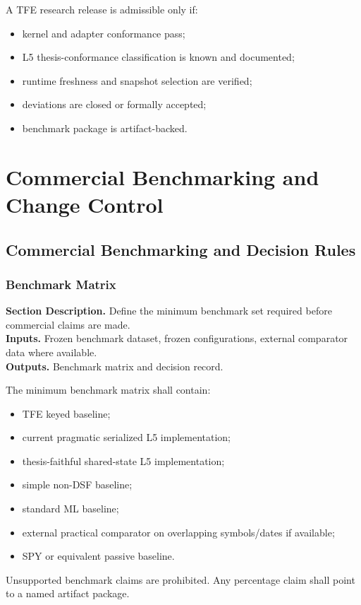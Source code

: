 \documentclass[11pt]{report}
\newcommand{\meta}[3]{\textbf{Section Description.} #1\\
\textbf{Inputs.} #2\\
\textbf{Outputs.} #3\par}
\begin{document}
A TFE research release is admissible only if:
\begin{itemize}
    \item kernel and adapter conformance pass;
    \item L5 thesis-conformance classification is known and documented;
    \item runtime freshness and snapshot selection are verified;
    \item deviations are closed or formally accepted;
    \item benchmark package is artifact-backed.
\end{itemize}

\part{Commercial Benchmarking and Change Control}

\chapter{Commercial Benchmarking and Decision Rules}
\section{Benchmark Matrix}
\meta{Define the minimum benchmark set required before commercial claims are made.}{Frozen benchmark dataset, frozen configurations, external comparator data where available.}{Benchmark matrix and decision record.}

The minimum benchmark matrix shall contain:
\begin{itemize}
    \item TFE keyed baseline;
    \item current pragmatic serialized L5 implementation;
    \item thesis-faithful shared-state L5 implementation;
    \item simple non-DSF baseline;
    \item standard ML baseline;
    \item external practical comparator on overlapping symbols/dates if available;
    \item SPY or equivalent passive baseline.
\end{itemize}
Unsupported benchmark claims are prohibited. Any percentage claim shall point to a named artifact package.
\end{document}
